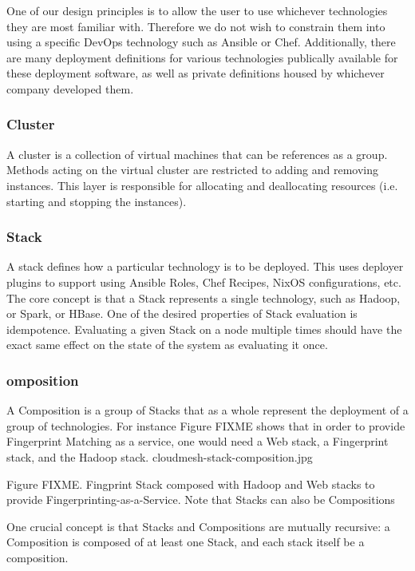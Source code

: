 \documentclass[9pt,twocolumn,twoside]{styles/osajnl}
\begin{document}
One of our design principles is to allow the user to use whichever technologies they are most familiar with. Therefore we do not wish to constrain them into using a specific DevOps technology such as Ansible or Chef. Additionally, there are many deployment definitions for various technologies publically available for these deployment software, as well as private definitions housed by whichever company developed them. 


\subsubsection{Cluster}

A cluster is a collection of virtual machines that can be references as a group. Methods acting on the virtual cluster are restricted to adding and removing instances. This layer is responsible for allocating and deallocating resources (i.e. starting and stopping the instances).


\subsubsection{Stack}

A stack defines how a particular technology is to be deployed. This uses deployer plugins to support using Ansible Roles, Chef Recipes, NixOS configurations, etc. The core concept is that a Stack represents a single technology, such as Hadoop, or Spark, or HBase. One of the desired properties of Stack evaluation is idempotence. Evaluating a given Stack on a node multiple times should have the exact same effect on the state of the system as evaluating it once.


\subsubsection{omposition}

A Composition is a group of Stacks that as a whole represent the deployment of a group of technologies. For instance Figure FIXME shows that in order to provide Fingerprint Matching as a service, one would need a Web stack, a Fingerprint stack, and the Hadoop stack.
 cloudmesh-stack-composition.jpg 

Figure FIXME. Fingprint Stack composed with Hadoop and Web stacks to
provide Fingerprinting-as-a-Service. Note that Stacks can also be Compositions


One crucial concept is that Stacks and Compositions are mutually recursive: a Composition is composed of at least one Stack, and each stack itself be a composition.
\end{document}
